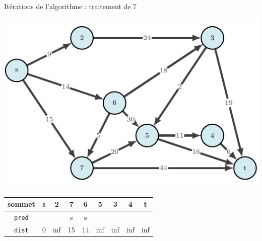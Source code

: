 \begin{frame}{Itérations de l'algorithme : traitement de $7$}
    \begin{center}
        \includegraphics[height=.6\textheight]{fig/ordinal-0.pdf}      
    \begin{tabular}{c|cccccccc}
        
        sommet & s       &2      &7      &6      &5      &3      &4      &t      \\
        \hline
        \texttt{pred} & &       &s      &s      &       &       &       &       \\
        \texttt{dist} & 0       &inf    &15     &14     &inf    &inf    &inf    &inf    \\
    \end{tabular}
\end{center}
\end{frame}

